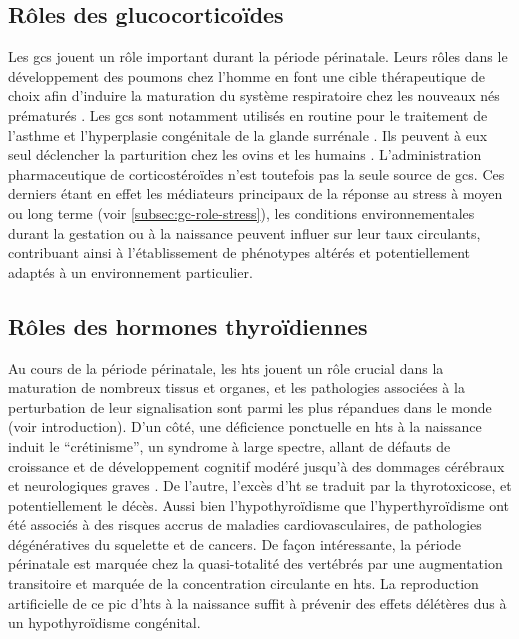 \documentclass[../main.tex]{subfiles}
\begin{document}

\subsection{Rôles des glucocorticoïdes}

Les \glspl{gc} jouent un rôle important durant la période périnatale.
Leurs rôles dans le développement des poumons chez l'homme en font une cible thérapeutique de choix afin d'induire la maturation du système respiratoire chez les nouveaux nés prématurés \citep{NGC2010}.
Les \glspl{gc} sont notamment utilisés en routine pour le traitement de l'asthme \citep{Clifton2005,Osei-Kumah2011} et l'hyperplasie congénitale de la glande surrénale \citep{Forest2004}.
Ils peuvent à eux seul déclencher la parturition chez les ovins et les humains \citep{Mati1973,Whittle2001}.
L’administration pharmaceutique de corticostéroïdes n'est toutefois pas la seule source de \glspl{gc}.
Ces derniers étant en effet les médiateurs principaux de la réponse au stress à moyen ou long terme (voir \autoref{subsec:gc-role-stress}), les conditions environnementales durant la gestation ou à la naissance peuvent influer sur leur taux circulants, contribuant ainsi à l'établissement de phénotypes altérés et potentiellement adaptés à un environnement particulier.


\subsection{Rôles des hormones thyroïdiennes}

Au cours de la période périnatale, les \glspl{ht} jouent un rôle crucial dans la maturation de nombreux tissus et organes, et les pathologies associées à la perturbation de leur signalisation sont parmi les plus répandues dans le monde (voir introduction).
D'un côté, une déficience ponctuelle en \glspl{ht} à la naissance induit le ``crétinisme'', un syndrome à large spectre, allant de défauts de croissance et de développement cognitif modéré jusqu'à des dommages cérébraux et neurologiques graves \citep{Delange1994,Chen2010}.
De l'autre, l'excès d'\gls{ht} se traduit par la thyrotoxicose, et potentiellement le décès.
Aussi bien l'hypothyroïdisme que l'hyperthyroïdisme ont été associés à des risques accrus de maladies cardiovasculaires, de pathologies dégénératives du squelette et de cancers.
De façon intéressante, la période périnatale est marquée chez la quasi-totalité des vertébrés par une augmentation transitoire et marquée de la concentration circulante en \glspl{ht}.
La reproduction artificielle de ce pic d'\glspl{ht} à la naissance suffit à prévenir des effets délétères dus à un hypothyroïdisme congénital.
\end{document}
